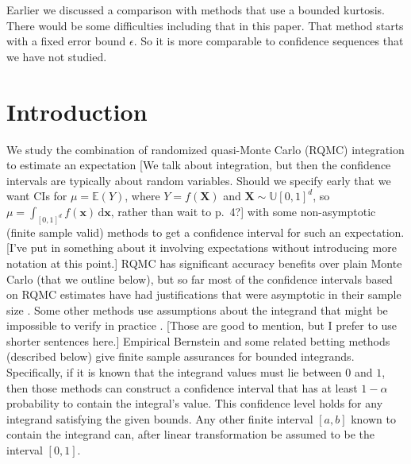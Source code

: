 \documentclass{article}
\newcommand{\art}[1]{\begingroup\color{blue}#1\endgroup}
\newcommand{\fred}[1]{\begingroup\color{red}#1\endgroup}
\begin{document}
\art{Earlier we discussed a comparison with methods that use a
bounded kurtosis. There would be some difficulties including that
in this paper.  That method starts with a fixed error bound $\epsilon$. So
it is more comparable to confidence sequences that we have not
studied.}

\section{Introduction}

We study the combination of randomized quasi-Monte
Carlo (RQMC) integration \art{to estimate an expectation} \fred{[We talk about integration, but then the confidence intervals are typically about random variables.  Should we specify early that we want CIs for $\mu = \mathbb{E}(Y)$, where $Y = f(\boldsymbol{X})$ and $\boldsymbol{X} \sim \mathbb{U}[0,1]^d$, so $\mu = \int_{[0,1]^d} f(\boldsymbol{x}) \, \mathrm{d} \boldsymbol{x}$, rather than wait to p.\ 4?]} 
with some non-asymptotic \art{(finite sample valid)} methods
to get a confidence interval for such an expectation.
\art{[I've put in something about it involving expectations without introducing more notation at this point.]}
RQMC has significant accuracy  benefits over plain Monte Carlo (that
we outline below), but so far most of the confidence intervals based on
RQMC estimates have had justifications that were asymptotic
in their sample size \fred{\cite{LEcEtal24a}. \art{Some other methods use} assumptions about the integrand that might be impossible to verify in practice \cite{HicJim16a,JimHic16a}}. \art{[Those are good to mention, but I prefer to use shorter sentences here.]} Empirical Bernstein and some related betting
methods (described below) give finite sample assurances for bounded integrands.  Specifically, if it is known that the integrand values must lie
between $0$ and $1$, then those methods can construct a confidence
interval that has at least $1-\alpha$ probability to contain
the integral's value.  This confidence level holds for any integrand
satisfying the given bounds.  Any other finite interval $[a,b]$ known
to contain the integrand can, after linear transformation
be assumed to be the interval $[0,1]$.
\end{document}
